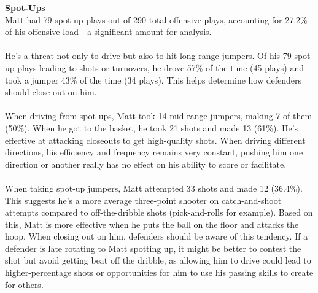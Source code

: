 \documentclass[a4paper,12pt]{article}
\begin{document}
\begin{multicols}{2}
    {\large \noindent \textbf{Spot-Ups}} \\
    Matt had 79 spot-up plays out of 290 total offensive plays, accounting for 27.2\% of his offensive load—a significant amount for analysis. \\ \\
    He's a threat not only to drive but also to hit long-range jumpers. Of his 79 spot-up plays leading to shots or turnovers, he drove 57\% of the time (45 plays) and took a jumper 43\% of the time (34 plays). This helps determine how defenders should close out on him. \\ \\ 
    When driving from spot-ups, Matt took 14 mid-range jumpers, making 7 of them (50\%). When he got to the basket, he took 21 shots and made 13 (61\%). He's effective at attacking closeouts to get high-quality shots. When driving different directions, his efficiency and frequency remains very constant, pushing him one direction or another really has no effect on his ability to score or facilitate. \\ \\
    When taking spot-up jumpers, Matt attempted 33 shots and made 12 (36.4\%). This suggests he's a more average three-point shooter on catch-and-shoot attempts compared to off-the-dribble shots (pick-and-rolls for example).
    Based on this, Matt is more effective when he puts the ball on the floor and attacks the hoop. When closing out on him, defenders should be aware of this tendency. If a defender is late rotating to Matt spotting up, it might be better to contest the shot but avoid getting beat off the dribble, as allowing him to drive could lead to higher-percentage shots or opportunities for him to use his passing skills to create for others.
    \vspace{1em}
    

\end{multicols}
\end{document}
